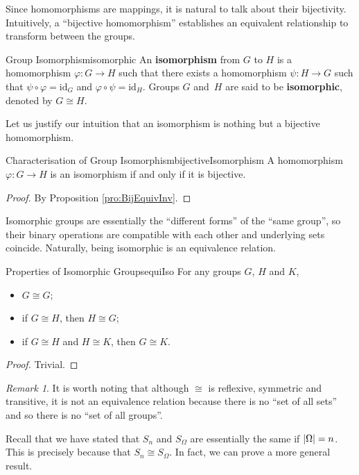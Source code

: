 \documentclass[math]{amznotes}
\theoremstyle{remark}
\newtheorem*{remark}{Remark}
\newcommand{\0}{\mathbf{0}}
\newcommand{\1}{\mathbf{1}}
\begin{document}
Since homomorphisms are mappings, it is natural to talk about their bijectivity. Intuitively, a ``bijective homomorphism'' establishes an equivalent relationship to transform between the groups.
\begin{dfnbox}{Group Isomorphism}{isomorphic}
    An {\color{red} \textbf{isomorphism}} from $G$ to $H$ is a homomorphism $\varphi \colon G \to H$ such that there exists a homomorphism $\psi \colon H \to G$ such that $\psi \circ \varphi = \mathrm{id}_G$ and $\varphi \circ \psi = \mathrm{id}_H$. Groups $G$ and~$H$ are said to be {\color{red} \textbf{isomorphic}}, denoted by $G \cong H$.
\end{dfnbox}
Let us justify our intuition that an isomorphism is nothing but a bijective homomorphism.
\begin{probox}{Characterisation of Group Isomorphism}{bijectiveIsomorphism}
    A homomorphism $\varphi \colon G \to H$ is an isomorphism if and only if it is bijective.
    \tcblower
    \begin{proof}
        By Proposition \ref{pro:BijEquivInv}.
    \end{proof}
\end{probox}
Isomorphic groups are essentially the ``different forms'' of the ``same group'', so their binary operations are compatible with each other and underlying sets coincide. Naturally, being isomorphic is an equivalence relation.
\begin{probox}{Properties of Isomorphic Groups}{equiIso}
    For any groups $G$, $H$ and $K$, 
    \begin{itemize}
        \item $G \cong G$;
        \item if $G \cong H$, then $H \cong G$;
        \item if $G \cong H$ and $H \cong K$, then $G \cong K$.
    \end{itemize}
    \tcblower
    \begin{proof}
        Trivial.
    \end{proof}
\end{probox}
\begin{notebox}
    \begin{remark}
        It is worth noting that although $\cong$ is reflexive, symmetric and transitive, it is not an equivalence relation because there is no ``set of all sets'' and so there is no ``set of all groups''.
    \end{remark}
\end{notebox}
Recall that we have stated that $S_n$ and $S_{\Omega}$ are essentially the same if ${\left\lvert {\Omega} \right\rvert} = n$. This is precisely because that $S_n \cong S_{\Omega}$. In fact, we can prove a more general result.
\end{document}
